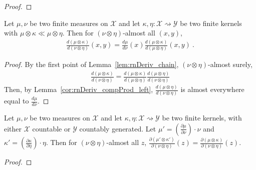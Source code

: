 \begin{proof}\leanok
\uses{}
\end{proof}


\begin{theorem}
  \label{thm:rnDeriv_chain_compProd}
  \leanok
  \uses{}
  Let $\mu, \nu$ be two finite measures on $\mathcal X$ and let $\kappa, \eta : \mathcal X \rightsquigarrow \mathcal Y$ be two finite kernels with $\mu \otimes \kappa \ll \mu \otimes \eta$. Then for $(\nu \otimes \eta)$-almost all $(x,y)$,
  \begin{align*}
  \frac{d(\mu \otimes \kappa)}{d(\nu \otimes \eta)}(x, y)
  = \frac{d \mu}{d \nu}(x) \frac{d(\mu \otimes \kappa)}{d(\mu \otimes \eta)}(x, y)
  \: .
  \end{align*}
\end{theorem}

\begin{proof}\leanok
{}
By the first point of Lemma~\ref{lem:rnDeriv_chain}, $(\nu \otimes \eta)$-almost surely,
\begin{align*}
\frac{d(\mu \otimes \kappa)}{d(\nu \otimes \eta)}
  = \frac{d(\mu \otimes \kappa)}{d(\mu \otimes \eta)} \frac{d (\mu \otimes \eta)}{d (\nu \otimes \eta)} 
\end{align*}
Then, by Lemma~\ref{cor:rnDeriv_compProd_left}, $\frac{d (\mu \otimes \eta)}{d (\nu \otimes \eta)}$ is almost everywhere equal to $\frac{d\mu}{d\nu}$.
\end{proof}


\begin{lemma}
  \label{lem:rnDeriv_eq_ac}
  \leanok
  Let $\mu, \nu$ be two measures on $\mathcal X$ and let $\kappa, \eta : \mathcal X \rightsquigarrow \mathcal Y$ be two finite kernels, with either $\mathcal X$ countable or $\mathcal{Y}$ countably generated.
  Let $\mu' = \left(\frac{\partial \mu}{\partial \nu}\right) \cdot \nu$ and $\kappa' = \left(\frac{\partial \kappa}{\partial \eta}\right) \cdot \eta$.
  Then for $(\nu \otimes \eta)$-almost all $z$, $\frac{\partial(\mu' \otimes \kappa')}{\partial (\nu \otimes \eta)}(z) = \frac{\partial(\mu \otimes \kappa)}{\partial (\nu \otimes \eta)}(z)$.
\end{lemma}

\begin{proof} \leanok
\end{proof}


